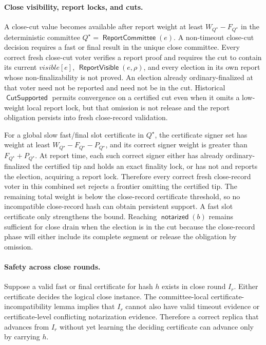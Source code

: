\documentclass[sigplan,twocolumn,review,anonymous]{acmart}
\newcommand{\func}[1]{\operatorname{\mathsf{#1}}}
\newcommand{\ReportCommittee}{\func{ReportCommittee}}
\newcommand{\notarized}{\func{notarized}}
\newcommand{\ReportVisible}{\func{ReportVisible}}
\begin{document}
\paragraph{Close visibility, report locks, and cuts.}
A close-cut value becomes available after report weight at least \(W_{Q^\star}-F_{Q^\star}\) in the
deterministic committee \(Q^\star=\ReportCommittee(e)\).  A non-timeout close-cut decision requires a
fast or final result in the unique close committee.  Every correct fresh close-cut voter verifies a
report proof and requires the cut to contain its current \(visible[e]\), \(\ReportVisible(e,\rho)\), and
every election in its own report whose non-finalizability is not proved.  An election already
ordinary-finalized at that voter need not be reported and need not be in the cut.  Historical
\(\func{CutSupported}\) permits convergence on a certified cut even when it omits a low-weight local
report lock, but that omission is not release and the report obligation persists into fresh close-record
validation.

For a global slow fast/final slot certificate in \(Q^\star\), the certificate signer set has weight at
least \(W_{Q^\star}-F_{Q^\star}-P_{Q^\star}\), and its correct signer weight is greater than
\(F_{Q^\star}+P_{Q^\star}\).  At report time, each such correct signer either has already
ordinary-finalized the certified tip and holds an exact finality lock, or has not and reports the
election, acquiring a report lock.  Therefore every correct fresh close-record voter in this combined
set rejects a frontier omitting the certified tip.  The remaining total weight is below the close-record
certificate threshold, so no incompatible close-record hash can obtain persistent support.  A fast slot
certificate only strengthens the bound.  Reaching \(\notarized(b)\) remains sufficient for close drain
when the election is in the cut because the close-record phase will either include its complete segment
or release the obligation by omission.

\paragraph{Safety across close rounds.}
Suppose a valid fast or final certificate for hash \(h\) exists in close round \(I_r\).  Either
certificate decides the logical close instance.  The committee-local certificate-incompatibility lemma
implies that \(I_r\) cannot also have valid timeout evidence or certificate-level conflicting
notarization evidence.  Therefore a correct replica that advances from \(I_r\) without yet learning
the deciding certificate can advance only by carrying \(h\).
\end{document}
